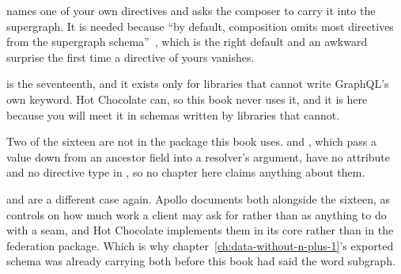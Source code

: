 %
 names one of your own directives and asks the composer
to carry it into the supergraph. It is needed because \enquote{by default,
composition omits most directives from the supergraph
schema}~\autocite{apollodirectives}, which is the right default and an awkward
surprise the first time a directive of yours vanishes.

%
 is the seventeenth, and it exists only for libraries that
cannot write GraphQL's own  keyword. Hot Chocolate can, so this
book never uses it, and it is here because you will meet it in schemas written
by libraries that cannot.

%
Two of the sixteen are not in the package this book uses.  and
, which pass a value down from an ancestor field into a
resolver's argument, have no attribute and no directive type in
, so no chapter here claims anything about
them.

%
 and  are a different case again. Apollo documents
both alongside the sixteen, as controls on how much work a client may ask
for rather than as anything to do with a seam, and Hot Chocolate implements
them in its core rather than in the federation package. Which is why
chapter~\ref{ch:data-without-n-plus-1}'s exported schema was already carrying
both before this book had said the word subgraph.
%
